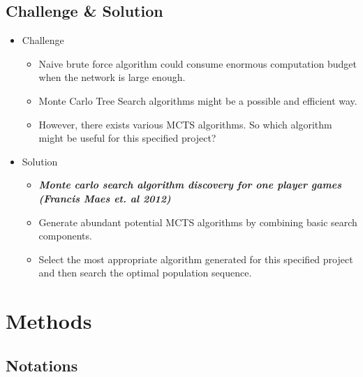 \documentclass[compress]{beamer}
\begin{document}
\subsection{Challenge \& Solution}
\begin{frame}
\begin{itemize}
  \item Challenge
    \begin{itemize}
      \item Naive brute force algorithm could consume enormous computation budget when the network is large enough.
      \item Monte Carlo Tree Search algorithms might be a possible and efficient way.
      \item However, there exists various MCTS algorithms. So which algorithm might be useful for this specified project?
    \end{itemize}
  \item Solution
    \begin{itemize}
      \item \textit{\textbf{Monte carlo search algorithm discovery for one player games (Francis Maes et. al 2012)}}
      \item Generate abundant potential MCTS algorithms by combining basic search components. 
      \item {\color{red}Select the most appropriate algorithm generated for this specified project and then search the optimal population sequence. }
    \end{itemize}
\end{itemize}
\end{frame}

\section{Methods}

\subsection{Notations}
\end{document}
